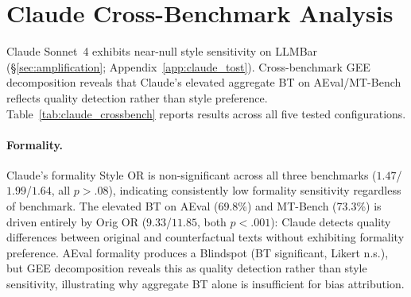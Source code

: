 \section{Claude Cross-Benchmark Analysis}
\label{app:claude_crossbench}

Claude Sonnet~4 exhibits near-null style sensitivity on LLMBar (\S\ref{sec:amplification}; Appendix~\ref{app:claude_tost}).
Cross-benchmark GEE decomposition reveals that Claude's elevated aggregate BT on AEval/MT-Bench reflects quality detection rather than style preference.
Table~\ref{tab:claude_crossbench} reports results across all five tested configurations.

\begin{table}[h]
\centering
\small
\caption{Claude Sonnet~4 cross-benchmark results with GEE decomposition. Formality Style OR is non-significant across all three benchmarks; elevated BT on AEval/MT-Bench is driven by Orig OR (quality detection). AEval verbosity is the sole genuine style effect.}
\label{tab:claude_crossbench}
\end{table}

\paragraph{Formality.}
Claude's formality Style OR is non-significant across all three benchmarks ($1.47$/$1.99$/$1.64$, all $p > .08$), indicating consistently low formality sensitivity regardless of benchmark.
The elevated BT on AEval (69.8\%) and MT-Bench (73.3\%) is driven entirely by Orig OR ($9.33$/$11.85$, both $p < .001$): Claude detects quality differences between original and counterfactual texts without exhibiting formality preference.
AEval formality produces a Blindspot (BT significant, Likert n.s.), but GEE decomposition reveals this as quality detection rather than style sensitivity, illustrating why aggregate BT alone is insufficient for bias attribution.

